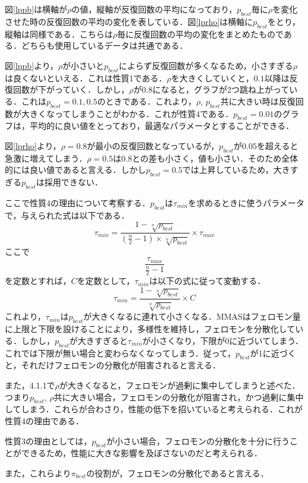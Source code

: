 \documentclass[a4j]{jsarticle}
\begin{document}
図\ref{lppb}は横軸が$\rho$の値，縦軸が反復回数の平均になっており，$p_{best}$毎に$\rho$を変化させた時の反復回数の平均の変化を表している．図\ref{lprho}は横軸に$p_{best}$をとり，縦軸は同様である．こちらは$\rho$毎に反復回数の平均の変化をまとめたものである．どちらも使用しているデータは共通である．
\par
図\ref{lppb}より，$\rho$が小さいと$p_{best}$によらず反復回数が多くなるため，小さすぎる$\rho$は良くないといえる．これは性質1である．$\rho$を大きくしていくと，$0.1$以降は反復回数が下がっていく．しかし，$\rho$が$0.8$になると，グラフが2つ跳ね上がっている．これは$p_{best} = 0.1, 0.5$のときである．これより，$\rho$, $p_{best}$共に大きい時は反復回数が大きくなってしまうことがわかる．これが性質4である．$p_{best} = 0.01$のグラフは，平均的に良い値をとっており，最適なパラメータとすることができる．
\par
図\ref{lprho}より，$\rho = 0.8$が最小の反復回数となっているが，$p_{best}$が$0.05$を超えると急激に増えてしまう．$\rho = 0.5$は$0.8$との差も小さく，値も小さい．そのため全体的には良い値であると言える．しかし$p_{best} = 0.5$では上昇しているため，大きすぎる$p_{best}$は採用できない．
\par
ここで性質4の理由について考察する．$p_{best}$は$\tau_{min}$を求めるときに使うパラメータで，与えられた式は以下である．
$$
\tau_{min} = \frac{1 - \sqrt[n]{p_{best}}}{(\frac{n}{2}-1)\times\sqrt[n]{p_{best}}}\times\tau_{max}
$$
ここで
$$
\frac{\tau_{max}}{\frac{n}{2}-1}
$$
を定数とすれば，$C$を定数として，$\tau_{min}$は以下の式に従って変動する．
$$
\tau_{min} = \frac{1 - \sqrt[n]{p_{best}}}{\sqrt[n]{p_{best}}}\times C
$$
これより，$\tau_{min}$は$p_{best}$が大きくなるに連れて小さくなる．MMASはフェロモン量に上限と下限を設けることにより，多様性を維持し，フェロモンを分散化している．しかし，$p_{best}$が大きすぎると$\tau_{min}$が小さくなり，下限が0に近づいてしまう．これでは下限が無い場合と変わらなくなってしまう．従って，$p_{best}$が1に近づくと，それだけフェロモンの分散化が阻害されると言える．
\par
また，4.1.1で$\rho$が大きくなると，フェロモンが過剰に集中してしまうと述べた．つまり$p_{best}$, $\rho$共に大きい場合，フェロモンの分散化が阻害され，かつ過剰に集中してしまう．これらが合わさり，性能の低下を招いていると考えられる．これが性質4の理由である．
\par
性質3の理由としては，$p_{best}$が小さい場合，フェロモンの分散化を十分に行うことができるため，性能に大きな影響を及ぼさないのだと考えられる．
\par
また，これらより$\pi_{best}$の役割が，フェロモンの分散化であると言える．
\end{document}
